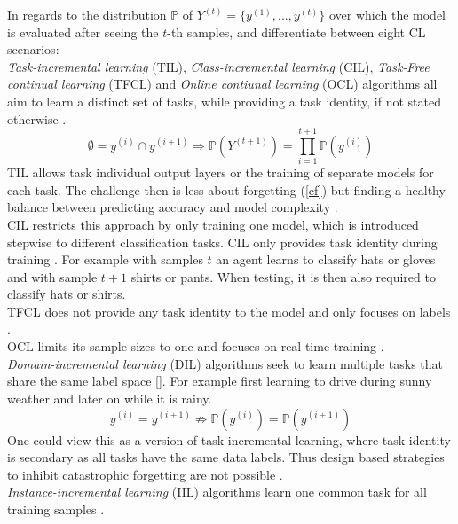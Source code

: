 In regards to the distribution $\mathbb{P}$ of $Y^{(t)} = \{y^{(1)}, ..., y^{(t)}\}$ over which the model is evaluated after seeing the $t$-th samples, \cite{bidaki2025} and \cite{LW} differentiate between eight CL scenarios:\\
\textit{Task-incremental learning} (TIL), \textit{Class-incremental learning} (CIL), \textit{Task-Free continual learning} (TFCL) and \textit{Online contiunal learning} (OCL) algorithms all aim to learn a distinct set of tasks, while providing a task identity, if not stated otherwise \cite{bidaki2025, LW}.
\begin{equation}
	\emptyset = y^{(i)} \cap y^{(i+1)} \Rightarrow \mathbb{P}(Y^{(t+1)}) = \prod_{i = 1}^{t+1}\mathbb{P}(y^{(i)})
\end{equation}
TIL allows task individual output layers or the training of separate models for each task. The challenge then is less about forgetting (\autoref{cf}) but finding a healthy balance between predicting accuracy and model complexity \cite{vandeVen2022}.\\
CIL restricts this approach by only training one model, which is introduced stepwise to different classification tasks. CIL only provides task identity during training \cite{vandeVen2022}. For example with samples $t$ an agent learns to classify hats or gloves and with sample $t+1$ shirts or pants. When testing, it is then also required to classify hats or shirts.\\
TFCL does not provide any task identity to the model and only focuses on labels \cite{aljundi2019tfcl}.\\
OCL limits its sample sizes to one and focuses on real-time training \cite{bidaki2025, LW}.\\
\textit{Domain-incremental learning} (DIL) algorithms seek to learn multiple tasks that share the same label space []. For example first learning to drive during sunny weather and later on while it is rainy.
\begin{equation}
	y^{(i)}=y^{(i+1)} \nRightarrow \mathbb{P}(y^{(i)}) = \mathbb{P}(y^{(i+1)})
\end{equation}
One could view this as a version of task-incremental learning, where task identity is secondary as all tasks have the same data labels. Thus design based strategies to inhibit catastrophic forgetting are not possible \cite{vandeVen2022}.\\
\textit{Instance-incremental learning} (IIL) algorithms learn one common task for all training samples \cite{bidaki2025, LW}.
